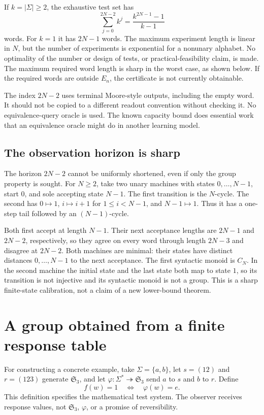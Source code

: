 \documentclass[11pt]{article}
\theoremstyle{remark}
\newcommand{\sg}{\mathfrak S_3}
\begin{document}
If $k=|\Sigma|\ge2$, the exhaustive test set has
\[
 \sum_{j=0}^{2N-2}k^j=\frac{k^{2N-1}-1}{k-1}
\]
words. For $k=1$ it has $2N-1$ words. The maximum experiment length is linear in $N$, but the number of experiments is exponential for a nonunary alphabet. No optimality of the number or design of tests, or practical-feasibility claim, is made. The maximum required word length is sharp in the worst case, as shown below. If the required words are outside $E_n$, the certificate is not currently obtainable.

The index $2N-2$ uses terminal Moore-style outputs, including the empty word. It should not be copied to a different readout convention without checking it. No equivalence-query oracle is used. The known capacity bound does essential work that an equivalence oracle might do in another learning model.

\subsection{The observation horizon is sharp}

The horizon $2N-2$ cannot be uniformly shortened, even if only the group property is sought. For $N\ge2$, take two unary machines with states $0,\ldots,N-1$, start $0$, and sole accepting state $N-1$. The first transition is the $N$-cycle. The second has $0\mapsto1$, $i\mapsto i+1$ for $1\le i<N-1$, and $N-1\mapsto1$. Thus it has a one-step tail followed by an $(N-1)$-cycle.

Both first accept at length $N-1$. Their next acceptance lengths are $2N-1$ and $2N-2$, respectively, so they agree on every word through length $2N-3$ and disagree at $2N-2$. Both machines are minimal: their states have distinct distances $0,\ldots,N-1$ to the next acceptance. The first syntactic monoid is $C_N$. In the second machine the initial state and the last state both map to state $1$, so its transition is not injective and its syntactic monoid is not a group. This is a sharp finite-state calibration, not a claim of a new lower-bound theorem.

\section{A group obtained from a finite response table}
\label{sec:group}

For constructing a concrete example, take $\Sigma=\{a,b\}$, let $s=(12)$ and $r=(123)$ generate $\sg$, and let $\varphi:\Sigma^*\twoheadrightarrow\sg$ send $a$ to $s$ and $b$ to $r$. Define
\[
 f(w)=1\quad\Longleftrightarrow\quad\varphi(w)=e.
\]
This definition specifies the mathematical test system. The observer receives response values, not $\sg$, $\varphi$, or a promise of reversibility.
\end{document}
